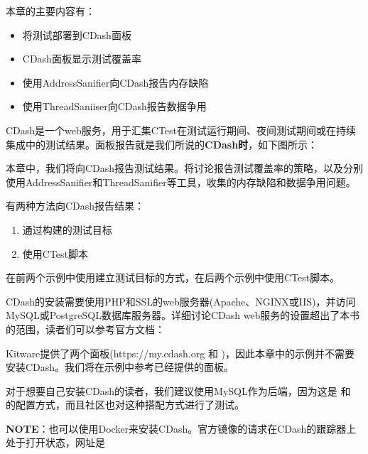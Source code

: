 本章的主要内容有：

\begin{itemize}
\item 将测试部署到CDash面板

\item CDash面板显示测试覆盖率

\item 使用AddressSanifier向CDash报告内存缺陷

\item 使用ThreadSaniiser向CDash报告数据争用

\end{itemize}

CDash是一个web服务，用于汇集CTest在测试运行期间、夜间测试期间或在持续集成中的测试结果。面板报告就是我们所说的\textbf{CDash时}，如下图所示：


本章中，我们将向CDash报告测试结果。将讨论报告测试覆盖率的策略，以及分别使用AddressSanifier和ThreadSanifier等工具，收集的内存缺陷和数据争用问题。

有两种方法向CDash报告结果：

\begin{enumerate}
\item 通过构建的测试目标

\item 使用CTest脚本

\end{enumerate}

在前两个示例中使用建立测试目标的方式，在后两个示例中使用CTest脚本。


CDash的安装需要使用PHP和SSL的web服务器(Apache、NGINX或IIS)，并访问MySQL或PostgreSQL数据库服务器。详细讨论CDash web服务的设置超出了本书的范围，读者们可以参考官方文档：

Kitware提供了两个面板(https://my.cdash.org 和  )，因此本章中的示例并不需要安装CDash。我们将在示例中参考已经提供的面板。

对于想要自己安装CDash的读者，我们建议使用MySQL作为后端，因为这是  和  的配置方式，而且社区也对这种搭配方式进行了测试。

\begin{myInfoBox}
\textbf{NOTE}：也可以使用Docker来安装CDash。官方镜像的请求在CDash的跟踪器上处于打开状态，网址是
\end{myInfoBox}


